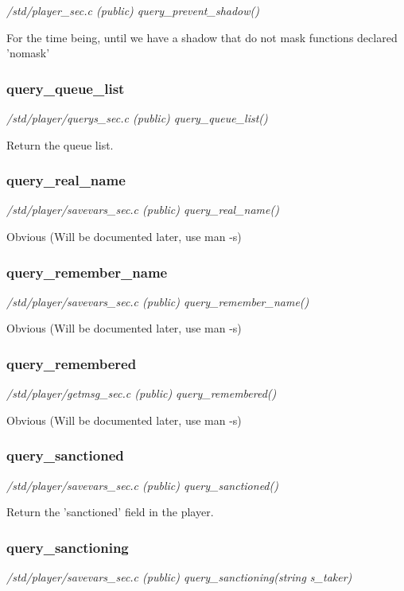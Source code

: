 {\em /std/player\_sec.c (public) query\_prevent\_shadow()}

For the time being, until we have a shadow that do not mask 
functions declared 'nomask'


\subsubsection{query\_queue\_list}

{\em /std/player/querys\_sec.c (public) query\_queue\_list()}

Return the queue list.


\subsubsection{query\_real\_name}

{\em /std/player/savevars\_sec.c (public) query\_real\_name()}

Obvious (Will be documented later, use man -s)


\subsubsection{query\_remember\_name}

{\em /std/player/savevars\_sec.c (public) query\_remember\_name()}

Obvious (Will be documented later, use man -s)


\subsubsection{query\_remembered}

{\em /std/player/getmsg\_sec.c (public) query\_remembered()}

Obvious (Will be documented later, use man -s)


\subsubsection{query\_sanctioned}

{\em /std/player/savevars\_sec.c (public) query\_sanctioned()}

Return the 'sanctioned' field in the player.


\subsubsection{query\_sanctioning}

{\em /std/player/savevars\_sec.c (public) query\_sanctioning(string s\_taker)}


